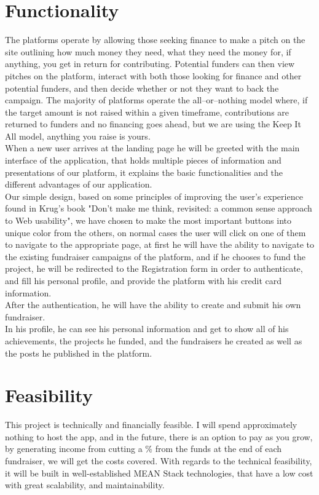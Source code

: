 \section{Functionality}
The platforms operate by allowing those seeking finance to make a pitch on the site outlining how much money they need, what they need the money for, if anything, you get in return for contributing. Potential funders can then view pitches on the platform, interact with both those looking for finance and other potential funders, and then decide whether or not they want to back the campaign. The majority of platforms operate the all–or–nothing model where, if the target amount is not raised within a given timeframe, contributions are returned to funders and no financing goes ahead, but we are using the Keep It All model, anything you raise is yours.\\

When a new user arrives at the landing page he will be greeted with the main interface of the application, that holds multiple pieces of information and presentations of our platform, it explains the basic functionalities and the different advantages of our application.\\

Our simple design, based on some principles of improving the user's experience found in Krug's book "Don't make me think, revisited: a common sense approach to Web usability", we have chosen to make the most important buttons into unique color from the others, on normal cases the user will click on one of them to navigate to the appropriate page, at first he will have the ability to navigate to the existing fundraiser campaigns of the platform, and if he chooses to fund the project, he will be redirected to the Registration form in order to authenticate, and fill his personal profile, and provide the platform with his credit card information.\\

After the authentication, he will have the ability to create and submit his own fundraiser.\\

In his profile, he can see his personal information and get to show all of his achievements, the projects he funded, and the fundraisers he created as well as the posts he published in the platform. 

\section{Feasibility}
This project is technically and financially feasible. I will spend approximately nothing to host the app, and in the future, there is an option to pay as you grow, by generating income from cutting a \% from the funds at the end of each fundraiser, we will get the costs covered. With regards to the technical feasibility, it will be built in well-established MEAN Stack technologies, that have a low cost with great scalability, and maintainability.

